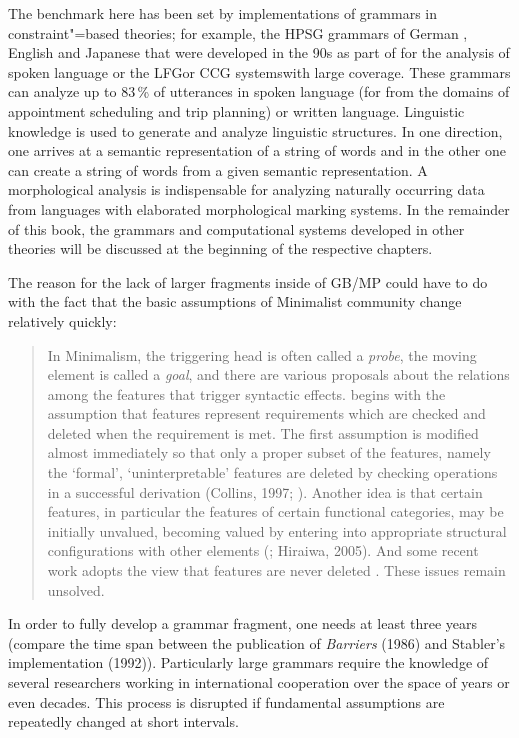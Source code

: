 The benchmark here has been set by implementations of grammars in constraint"=based theories; for example, the
HPSG grammars of German \citep{MK2000a}, English \citep*{FCS2000a} and
Japanese \citep{Siegel2000a} that were developed
in the 90s as part of \verbmobil \citep{Wahlster2000a-ed-not-crossreferenced} for the analysis of spoken language  or
the LFG\indexlfg or CCG systems\indexccg with large coverage. These grammars can analyze up to 83\,\% of utterances in spoken language
(for \verbmobil from the domains of appointment scheduling and trip planning) or written language. Linguistic knowledge is used to generate and analyze 
linguistic structures. In one direction, one arrives at a semantic representation of a string of words and in the other one can create a string
of words from a given semantic representation. A morphological analysis is indispensable for analyzing naturally occurring data from languages with
elaborated morphological marking systems. In the remainder of this book, the grammars and computational systems developed in other theories will be discussed at the beginning of the
respective chapters.

The reason for the lack of larger fragments inside of GB/MP could have to do with the fact that the basic assumptions of Minimalist community
change relatively quickly:
\begin{quote}
\label{Zitat-Stabler}
In Minimalism, the triggering head is often called a \emph{probe}, the moving element is called a
\emph{goal}, and there are various proposals about the relations among the features that trigger
syntactic effects. \citet[p.\,229]{Chomsky95a-u} begins with the assumption that features represent
requirements which are checked and deleted when the requirement is met. The first assumption is
modified almost immediately so that only a proper subset of the features, namely the `formal',
`uninterpretable' features are deleted by checking operations in a successful derivation (Collins,
1997; \citealp[§4.5]{Chomsky95a-u}). Another idea is that certain features, in particular the
features of certain functional categories, may be initially unvalued, becoming valued by entering
into appropriate structural configurations with other elements (\citealp{Chomsky2008a}; Hiraiwa,
2005). And some recent work adopts the view that features are never deleted
\citep[p.\,11]{Chomsky2007a}. These issues remain unsolved. \citep[]{Stabler2010a} 
\end{quote}
In order to fully develop a grammar fragment, one needs at least three years (compare the time span between the publication of \emph{Barriers} (1986)
and Stabler's implementation (1992)). Particularly large grammars require the knowledge of several researchers working in international cooperation
over the space of years or even decades. This process is disrupted if fundamental assumptions are repeatedly changed at short intervals.

